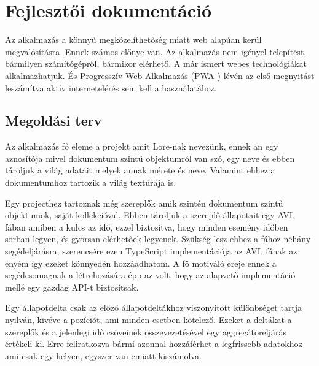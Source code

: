 \chapter{Fejlesztői dokumentáció}
\label{ch:impl}

Az alkalmazás a könnyű megközelíthetőség miatt web alapúan kerül megvalósításra. Ennek számos előnye van. Az alkalmazás nem igényel telepítést, bármilyen számítógépről, bármikor elérhető. A már ismert webes technológiákat alkalmazhatjuk. És Progresszív Web Alkalmazás (PWA \cite{PWA}) lévén az első megnyitást leszámítva aktív internetelérés sem kell a használatához.

\section{Megoldási terv}

Az alkalmazás fő eleme a projekt amit Lore-nak nevezünk, ennek an egy aznosítója mivel dokumentum szintű objektumról van szó, egy neve és ebben tároljuk a világ adatait melyek annak mérete és neve. Valamint ehhez a dokumentumhoz tartozik a világ textúrája is.

Egy projecthez tartoznak még szereplők amik szintén dokumentum szintű objektumok, saját kollekcióval. Ebben tároljuk a szereplő állapotait egy AVL fában \cite{AVL} amiben a kulcs az idő, ezzel biztosítva, hogy minden esemény időben sorban legyen, és gyorsan elérhetőek legyenek. Szükség lesz ehhez a fához néhány segédeljárásra, szerencsére ezen TypeScript implementációja az AVL fának az enyém így ezeket könnyedén hozzáadhatom. A fő motiváló ereje ennek a segédcsomagnak a létrehozására épp az volt, hogy az alapvető implementáció mellé egy gazdag API-t biztosítsak.

Egy állapotdelta csak az előző állapotdeltákhoz viszonyított különbséget tartja nyilván, kivéve a pozíciót, ami minden esetben kötelező. Ezeket a deltákat a szereplők és a jelenlegi idő csöveinek összevezetésével egy aggregátoreljárás értékeli ki. Erre feliratkozva bármi azonnal hozzáférhet a legfrissebb adatokhoz ami csak egy helyen, egyszer van emiatt kiszámolva.


